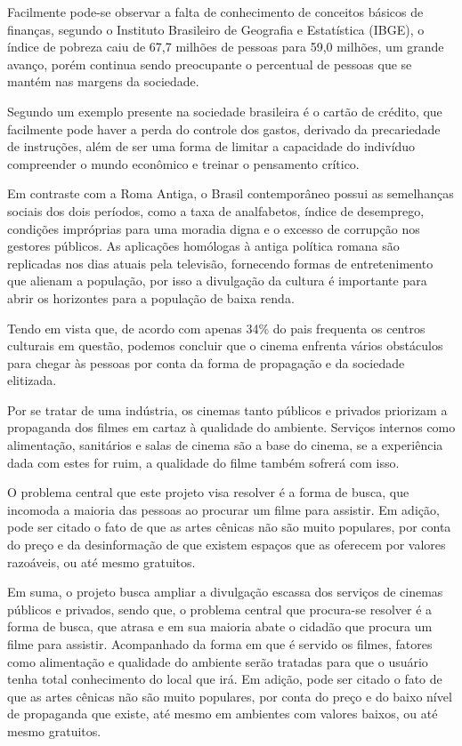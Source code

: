 \documentclass[
	article,			%
	12pt,				%
	oneside,			%
	a4paper,			%
	english,			%
	brazil,				%
	sumario=tradicional
	]{abntex2}
\begin{document}
 
    Facilmente pode-se observar a falta de conhecimento de conceitos básicos de finanças, segundo o Instituto Brasileiro de Geografia e Estatística (IBGE), o índice de pobreza caiu de 67,7 milhões de pessoas para 59,0 milhões, um grande avanço, porém continua sendo preocupante o percentual de pessoas que se mantém nas margens da sociedade. 
    
     Segundo  um exemplo presente na sociedade brasileira é o cartão de crédito, que facilmente pode haver a perda do controle dos gastos, derivado da precariedade de instruções, além de ser uma forma de limitar a capacidade do indivíduo compreender o mundo econômico e treinar o pensamento crítico. 
    
    Em contraste com a Roma Antiga, o Brasil contemporâneo possui as semelhanças sociais dos dois períodos, como a taxa de analfabetos, índice de desemprego, condições impróprias para uma moradia digna e o excesso de corrupção nos gestores públicos. As aplicações homólogas à antiga política romana são replicadas nos dias atuais pela televisão, fornecendo formas de entretenimento que alienam a população, por isso a divulgação da cultura é importante para abrir os horizontes para a população de baixa renda.

    Tendo em vista que, de acordo com  apenas 34\% do pais frequenta os centros culturais em questão, podemos concluir que o cinema enfrenta vários obstáculos para chegar às pessoas por conta da forma de propagação e da sociedade elitizada. 

    Por se tratar de uma indústria, os cinemas tanto públicos e privados priorizam a propaganda dos filmes em cartaz à qualidade do ambiente. Serviços internos como alimentação, sanitários e salas de cinema são a base do cinema, se a experiência dada com estes for ruim, a qualidade do filme também sofrerá com isso.

    O problema central que este projeto visa resolver é a forma de busca, que incomoda a maioria das pessoas ao procurar um filme para assistir. Em adição, pode ser citado o fato de que as artes cênicas não são muito populares, por conta do preço e da desinformação de que existem espaços que as oferecem por valores razoáveis, ou até mesmo gratuitos.

    Em suma, o projeto busca ampliar a divulgação escassa dos serviços de cinemas públicos e privados, sendo que, o problema central que procura-se resolver é a forma de busca, que atrasa e em sua maioria abate o cidadão que procura um filme para assistir. Acompanhado da forma em que é servido os filmes, fatores como alimentação e qualidade do ambiente serão tratadas para que o usuário tenha total conhecimento do local que irá. Em adição, pode ser citado o fato de que as artes cênicas não são muito populares, por conta do preço e do baixo nível de propaganda que existe, até mesmo em ambientes com valores baixos, ou até mesmo gratuitos.
\end{document}

